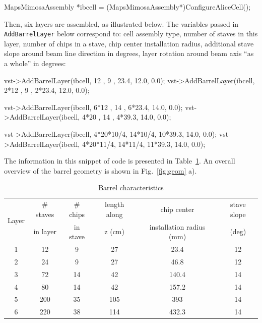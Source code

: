 \documentclass[12pt]{article}
\begin{document}
\begin{tcolorbox}
\begin{verbnobox}[\scriptsize]
MapsMimosaAssembly *ibcell = (MapsMimosaAssembly*)ConfigureAliceCell();
\end{verbnobox}  
\end{tcolorbox}

Then, six layers are assembled, as illustrated below. The variables passed in \verb|AddBarrelLayer| below correspond to:
cell assembly type,
number of staves in this layer,
number of chips in a stave,
chip center installation radius,
additional stave slope around beam line direction in degrees,
layer rotation around beam axis ``as a whole'' in degrees:

\begin{tcolorbox}
\begin{verbnobox}[\scriptsize]
vst->AddBarrelLayer(ibcell,   12     ,  9     ,    23.4, 12.0, 0.0);
vst->AddBarrelLayer(ibcell, 2*12     ,  9     ,  2*23.4, 12.0, 0.0);

vst->AddBarrelLayer(ibcell, 6*12     , 14     ,  6*23.4, 14.0, 0.0);
vst->AddBarrelLayer(ibcell, 4*20     , 14     ,  4*39.3, 14.0, 0.0);

vst->AddBarrelLayer(ibcell, 4*20*10/4, 14*10/4, 10*39.3, 14.0, 0.0);
vst->AddBarrelLayer(ibcell, 4*20*11/4, 14*11/4, 11*39.3, 14.0, 0.0);
\end{verbnobox}  
\end{tcolorbox}

The information in this snippet of code is presented in Table~\ref{tab:barrel}.
An overall overview of the barrel geometry is shown in Fig.~\ref{fig:geom} a).

\begin{table}[H]
\centering
\caption{Barrel characteristics}
\label{tab:barrel}
\begin{tabular}{c|ccccc}
\hline
\multirow{2}{*}{Layer} & \# staves  & \# chips  &length along& chip center                     & stave slope \\
                                   &  in layer    & in stave  &z (cm)        & installation radius (mm) & (deg) \\
\hline \hline
1       			 & 12             & 9            & 27              & 23.4                            & 12                \\
2        			 & 24             & 9            & 27              & 46.8                            & 12                \\
3       			 & 72             & 14          & 42              & 140.4                           & 14                \\
4       			 & 80             & 14          & 42              & 157.2                           & 14                \\
5        			 & 200           & 35          & 105            & 393                             & 14                \\
6        			 & 220           & 38          & 114            & 432.3                           & 14               
\end{tabular}
\end{table}
\end{document}
